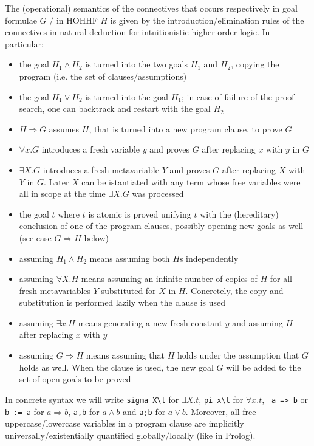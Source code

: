 \documentclass[preprint]{sigplanconf}
\begin{document}
The (operational) semantics of the connectives that occurs respectively in goal formulae $G$ / in HOHHF $H$ is given by the introduction/elimination rules of the connectives in natural deduction for intuitionistic higher order logic. In particular:
\begin{itemize}
\item the goal $H_1 \wedge H_2$ is turned into the two goals $H_1$ and $H_2$,
 copying the program (i.e. the set of clauses/assumptions)
\item the goal $H_1 \vee H_2$ is turned into the goal $H_1$; in case of failure of the proof search, one can backtrack and restart with the goal $H_2$
\item $H \Rightarrow G$ assumes $H$, that is turned into a new program clause, to prove $G$
\item $\forall x.G$ introduces a fresh variable $y$ and proves $G$ after replacing $x$ with $y$ in $G$
\item $\exists X.G$ introduces a fresh metavariable $Y$ and proves $G$ after replacing $X$ with $Y$ in $G$. Later $X$ can be istantiated with any term whose free variables were all in scope at the time $\exists X.G$ was processed
\item the goal $t$ where $t$ is atomic is proved unifying $t$ with the
(hereditary) conclusion of one of the program clauses, possibly opening new
goals as well (see case $G \Rightarrow H$ below)
\item assuming $H_1 \wedge H_2$ means assuming both $H$s independently
\item assuming $\forall X.H$ means assuming an infinite number of copies of $H$ for all fresh metavariables $Y$ substituted for $X$ in $H$. Concretely, the copy and substitution is performed lazily when the clause is used
\item assuming $\exists x.H$ means generating a new fresh constant $y$ and assuming $H$ after replacing $x$ with $y$
\item assuming $G \Rightarrow H$ means assuming that $H$ holds under the assumption that $G$ holds as well. When the clause is used, the new goal $G$ will be added to the set of open goals to be proved
\end{itemize}

In concrete syntax we will write \verb+sigma X\t+ for $\exists X.t$, \verb+pi x\t+ for $\forall x.t$, \verb+ a => b+ or \verb+b := a+ for $a \Rightarrow b$, \verb+a,b+ for $a \wedge b$ and \verb+a;b+ for $a \vee b$. Moreover, all free uppercase/lowercase variables in a program clause are implicitly universally/existentially quantified globally/locally (like in Prolog).
\end{document}
